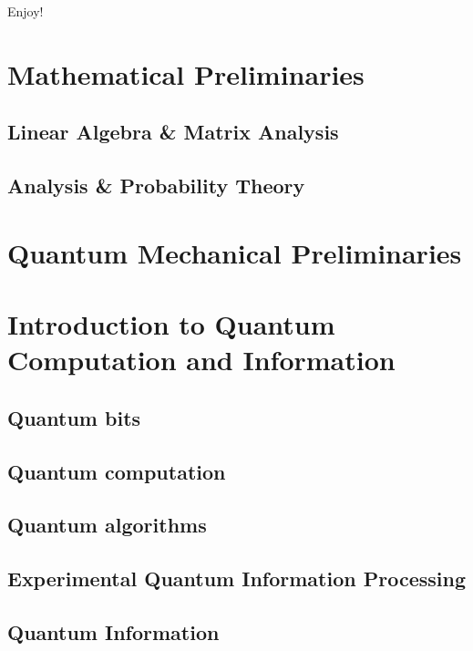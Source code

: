 \documentclass{article}
\theoremstyle{definition}
\begin{document}
Enjoy!


\newpage
\tableofcontents
\newpage

\section{Mathematical Preliminaries}
\subsection{Linear Algebra \& Matrix Analysis}
\subsection{Analysis \& Probability Theory}

\section{Quantum Mechanical Preliminaries}

\section{Introduction to Quantum Computation and Information}
\subsection{Quantum bits}
\subsection{Quantum computation}
\subsection{Quantum algorithms}
\subsection{Experimental Quantum Information Processing}
\subsection{Quantum Information}

\newpage
\end{document}
